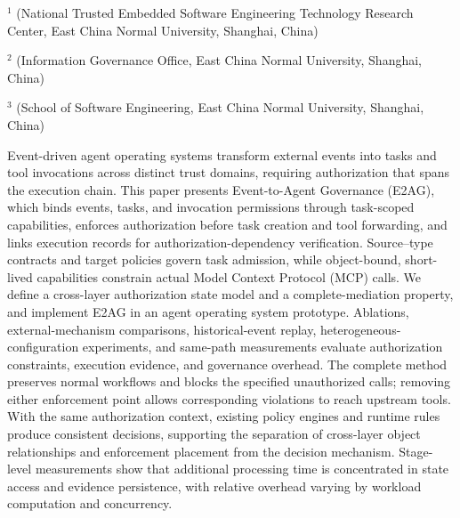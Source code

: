 \vspace{8pt}
\vspace{4pt}
\vspace{3pt}
\begingroup\fontsize{7.5pt}{10pt}\selectfont
\noindent$^{1}$ (National Trusted Embedded Software Engineering Technology Research Center, East China Normal University, Shanghai, China)\par
\noindent$^{2}$ (Information Governance Office, East China Normal University, Shanghai, China)\par
\noindent$^{3}$ (School of Software Engineering, East China Normal University, Shanghai, China)\par
\endgroup

\begin{josenabstract}
Event-driven agent operating systems transform external events into tasks and tool invocations across distinct trust domains, requiring authorization that spans the execution chain. This paper presents Event-to-Agent Governance (E2AG), which binds events, tasks, and invocation permissions through task-scoped capabilities, enforces authorization before task creation and tool forwarding, and links execution records for authorization-dependency verification. Source--type contracts and target policies govern task admission, while object-bound, short-lived capabilities constrain actual Model Context Protocol (MCP) calls. We define a cross-layer authorization state model and a complete-mediation property, and implement E2AG in an agent operating system prototype. Ablations, external-mechanism comparisons, historical-event replay, heterogeneous-configuration experiments, and same-path measurements evaluate authorization constraints, execution evidence, and governance overhead. The complete method preserves normal workflows and blocks the specified unauthorized calls; removing either enforcement point allows corresponding violations to reach upstream tools. With the same authorization context, existing policy engines and runtime rules produce consistent decisions, supporting the separation of cross-layer object relationships and enforcement placement from the decision mechanism. Stage-level measurements show that additional processing time is concentrated in state access and evidence persistence, with relative overhead varying by workload computation and concurrency.
\end{josenabstract}

\vspace{8pt}
